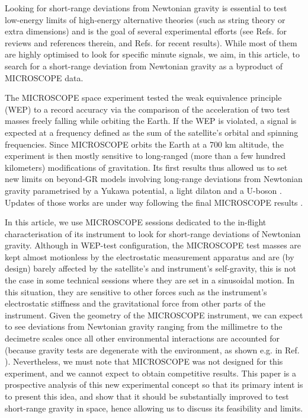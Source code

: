 \documentclass[12pt]{iopart}
\begin{document}
Looking for short-range deviations from Newtonian gravity is essential to test low-energy limits of high-energy alternative theories (such as string theory or extra dimensions) and is the goal of several experimental efforts (see Refs. \cite{fischbach99, adelberger03, adelberger09} for reviews and references therein, and Refs. \cite{tan20, lee20} for recent results). While most of them are highly optimised to look for specific minute signals, we aim, in this article, to search for a short-range deviation from Newtonian gravity as a byproduct of MICROSCOPE data.

The MICROSCOPE space experiment tested the weak equivalence principle (WEP) to a record accuracy \cite{touboul17, touboul19} via the comparison of the acceleration of two test masses freely falling while orbiting the Earth. If the WEP is violated, a signal is expected at a frequency defined as the sum of the satellite's orbital and spinning frequencies. Since MICROSCOPE orbits the Earth at a 700 km altitude, the experiment is then mostly sensitive to long-ranged (more than a few hundred kilometers) modifications of gravitation.  Its first results thus allowed us to set new limits on beyond-GR models involving long-range deviations from Newtonian gravity parametrised by a Yukawa potential, a light dilaton \cite{berge18} and a U-boson \cite{fayet18,fayet19}. Updates of those works are under way following the final MICROSCOPE results \cite{mic20, metris20}.

In this article, we use MICROSCOPE sessions dedicated to the in-flight characterisation of its instrument to look for short-range deviations of Newtonian gravity. Although in WEP-test configuration, the MICROSCOPE test masses are kept almost motionless by the electrostatic measurement apparatus and are (by design) barely affected by the satellite's and instrument's self-gravity, this is not the case in some technical sessions where they are set in a sinusoidal motion. In this situation, they are sensitive to other forces such as the instrument's electrostatic stiffness and the gravitational force from other parts of the instrument. Given the geometry of the MICROSCOPE instrument, we can expect to see deviations from Newtonian gravity ranging from the millimetre to the decimetre scales once all other environmental interactions are accounted for (because gravity tests are degenerate with the environment, as shown e.g. in Ref. \cite{berge18cqg}). Nevertheless, we must note that MICROSCOPE was not designed for this experiment, and we cannot expect to obtain competitive results. 
This paper is a prospective analysis of this new experimental concept so that its primary intent is to present this idea, and show that it should be substantially improved to test short-range gravity in space, hence allowing us to discuss its feasibility and limits.
\end{document}
